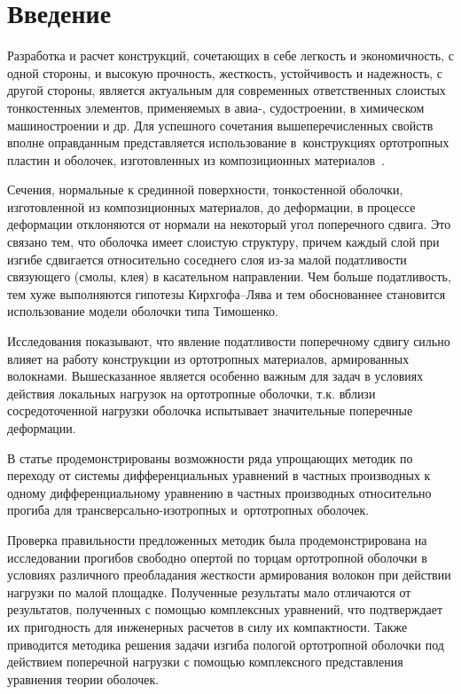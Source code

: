 \documentclass[press]{vestnik}
\begin{document}
\section*{Введение}

Разработка и расчет конструкций, сочетающих в себе легкость и экономичность, 
с одной стороны, и высокую прочность, жесткость, устойчивость и надежность, 
с другой стороны, является актуальным для современных ответственных слоистых 
тонкостенных элементов, применяемых в авиа-, судостроении, в химическом 
машиностроении и др. Для успешного сочетания вышеперечисленных свойств 
вполне оправданным представляется использование в~конструкциях ортотропных 
пластин и оболочек, изготовленных из композиционных материалов~\cite{B01,B02,B03,B04,B05,B06,B07,B08,B09,B10}.

Сечения, нормальные к срединной поверхности, тонкостенной оболочки, 
изготовленной из композиционных материалов, до деформации, в процессе 
деформации отклоняются от нормали на некоторый угол поперечного сдвига. Это 
связано тем, что оболочка имеет слоистую структуру, причем каждый слой при 
изгибе сдвигается относительно соседнего слоя из-за малой податливости 
связующего (смолы, клея) в касательном направлении. Чем больше податливость, 
тем хуже выполняются гипотезы Кирхгофа--Лява и тем обоснованнее становится 
использование модели оболочки типа Тимошенко. 

Исследования показывают, что явление податливости поперечному сдвигу сильно 
влияет на работу конструкции из ортотропных материалов, армированных 
волокнами. Вышесказанное является особенно важным для задач в условиях 
действия локальных нагрузок на ортотропные оболочки, т.к. вблизи 
сосредоточенной нагрузки оболочка испытывает значительные поперечные 
деформации.

В статье продемонстрированы возможности ряда упрощающих методик по переходу 
от системы дифференциальных уравнений в частных производных к одному 
дифференциальному уравнению в частных производных относительно прогиба для 
трансверсально-изотропных и~ортотропных оболочек.

Проверка правильности предложенных методик была продемонстрирована на 
исследовании прогибов свободно опертой по торцам ортотропной оболочки в 
условиях различного преобладания жесткости армирования волокон при действии 
нагрузки по малой площадке. Полученные результаты мало отличаются от 
результатов, полученных с помощью комплексных уравнений, что подтверждает их 
пригодность для инженерных расчетов в силу их компактности. Также приводится 
методика решения задачи изгиба пологой ортотропной оболочки под действием 
поперечной нагрузки с помощью комплексного представления уравнения теории 
оболочек.
\end{document}
